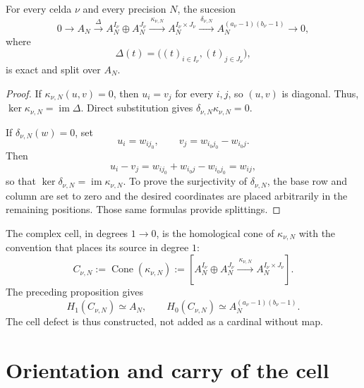 \begin{proposition}
\label{prop:pdfv2-coh-cell-exact}
For every celda \(\nu\) and every precision \(N\), the sucesion
\begin{equation}\label{eq:pdfv2-coh-exact-sequence}
 0\longrightarrow A_N
 \xrightarrow{\ \Delta\ }
 A_N^{I_\nu}\oplus A_N^{J_\nu}
 \xrightarrow{\ \kappa_{\nu,N}\ }
 A_N^{I_\nu\times J_\nu}
 \xrightarrow{\ \delta_{\nu,N}\ }
 A_N^{(a_\nu-1)(b_\nu-1)}
 \longrightarrow0,
\end{equation}
where
\[
 \Delta(t)=\bigl((t)_{i\in I_\nu},(t)_{j\in J_\nu}\bigr),
\]
is exact and split over \(A_N\).
\end{proposition}

\begin{proof}
If \(\kappa_{\nu,N}(u,v)=0\), then \(u_i=v_j\) for every \(i,j\), so \((u,v)\) is diagonal. Thus,
\(\ker\kappa_{\nu,N}=\operatorname{im}\Delta\). Direct substitution gives
\(\delta_{\nu,N}\kappa_{\nu,N}=0\).

If \(\delta_{\nu,N}(w)=0\), set
\[
 u_i=w_{i j_0},
 \qquad
 v_j=w_{i_0j_0}-w_{i_0j}.
\]
Then
\[
 u_i-v_j=w_{i j_0}+w_{i_0j}-w_{i_0j_0}=w_{ij},
\]
so that \(\ker\delta_{\nu,N}=\operatorname{im}\kappa_{\nu,N}\). To prove the surjectivity of \(\delta_{\nu,N}\), the base
row and column are set to zero and the desired coordinates are placed
arbitrarily in the remaining positions. Those same formulas provide
splittings.
\end{proof}

The complex cell, in degrees \(1\to0\), is the homological cone of
\(\kappa_{\nu,N}\) with the convention that places its source in degree \(1\):
\begin{equation}\label{eq:pdfv2-coh-cell-complex}
 C_{\nu,N}:=\operatorname{Cone}(\kappa_{\nu,N})
 :=\left[
 A_N^{I_\nu}\oplus A_N^{J_\nu}
 \xrightarrow{\ \kappa_{\nu,N}\ }
 A_N^{I_\nu\times J_\nu}
 \right].
\end{equation}
The preceding proposition gives
\begin{equation}\label{eq:pdfv2-coh-cell-homology}
 H_1(C_{\nu,N})\simeq A_N,
 \qquad
 H_0(C_{\nu,N})\simeq A_N^{(a_\nu-1)(b_\nu-1)}.
\end{equation}
The cell defect is thus constructed, not added as a cardinal without
map.

\section{Orientation and carry of the cell}
\label{sec:pdfv2-coh-orientation-carry}

